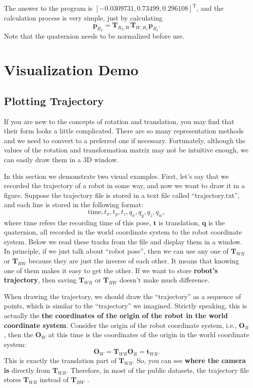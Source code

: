 The answer to the program is $ [- 0.0309731, 0.73499, 0.296108 ]^ \mathrm{T}$, and the calculation process is very simple, just by calculating $$ \mathbf{p}_{R_2} = \mathbf{T}_{ R_2, W} \mathbf{T}_{W, R_1} \mathbf{p}_{R_1}. $$ Note that the quaternion needs to be normalized before use.

\section{Visualization Demo}
\subsection{Plotting Trajectory}

If you are new to the concepts of rotation and translation, you may find that their form looks a little complicated. There are so many representation methods and we need to convert to a preferred one if necessary. Fortunately, although the values of the rotation and transformation matrix may not be intuitive enough, we can easily draw them in a 3D window.

In this section we demonstrate two visual examples. First, let's say that we recorded the trajectory of a robot in some way, and now we want to draw it in a figure. Suppose the trajectory file is stored in a text file called ``trajectory.txt'', and each line is stored in the following format: $$ \mathrm {time}, t_x, t_y, t_z, q_x, q_y, q_z, q_w, $$ where $ \mathrm {time} $ refers the recording time of this pose, $ \mathbf {t} $ is translation, $ \mathbf {q} $ is the quaternion, all recorded in the world coordinate system to the robot coordinate system. Below we read these tracks from the file and display them in a window. In principle, if we just talk about ``robot pose'', then we can use any one of $ \mathbf {T}_{WR} $ or $ \mathbf {T}_{RW} $ because they are just the inverse of each other. It means that knowing one of them makes it easy to get the other. If we want to store \textbf {robot's trajectory}, then saving $ \mathbf {T}_{WR} $ or $ \mathbf {T}_{RW} $ doesn't make much difference.

When drawing the trajectory, we should draw the ``trajectory'' as a sequence of points, which is similar to the ``trajectory'' we imagined. Strictly speaking, this is actually the \textbf {the coordinates of the origin of the robot in the world coordinate system}. Consider the origin of the robot coordinate system, i.e., $ \mathbf {O}_{R}$, then the $ \mathbf{O}_{W}$ at this time is the coordinates of the origin in the world coordinate system:
\begin{equation}
\mathbf{O} _ {W} = \mathbf{T} _ {WR} \mathbf {O} _R = \mathbf {t} _ {WR}.
\end{equation}
This is exactly the translation part of $ \mathbf {T}_{WR} $. So, you can see \textbf {where the camera is} directly from $ \mathbf {T}_{WR} $. Therefore, in most of the public datasets, the trajectory file stores $ \mathbf {T}_{WR} $ instead of $ \mathbf {T}_{RW} $ .

